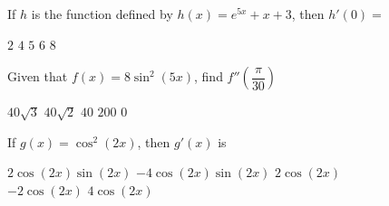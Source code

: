 \documentclass[11pt]{exam}
\newcommand{\horizontalline}{\noindent\makebox[\linewidth]{\rule{\textwidth}{1pt}}}
\begin{document}
\begin{questions}
    \question If $h$ is the function defined by $h(x) = e^{5x} + x + 3$, then $h'(0) = $ \\
    
    \begin{oneparchoices}
        \choice $2$
        \choice $4$
        \choice $5$
        \choice $6$
        \choice $8$
    \end{oneparchoices} \par \horizontalline

    \question Given that $f(x) = 8\sin^2 (5x)$, find $f''\left(\dfrac{\pi}{30}\right)$ \\

    \begin{oneparchoices}
        \choice $40\sqrt{3}$
        \choice $40\sqrt{2}$
        \choice $40$
        \choice $200$
        \choice $0$
    \end{oneparchoices} \par \horizontalline

    \question If $g(x) = \cos^2 (2x)$, then $g'(x)$ is \\

    \begin{oneparchoices}
        \choice $2\cos (2x)\sin (2x)$
        \choice $-4\cos (2x)\sin (2x)$
        \choice $2\cos (2x)$ \\[11pt]
        \makebox[0.25 \textwidth] \choice $-2\cos (2x)$ 
        \makebox[0.25 \textwidth] \choice $4\cos (2x)$
    \end{oneparchoices} \par \horizontalline

    \question 
    
\end{questions}
\end{document}
